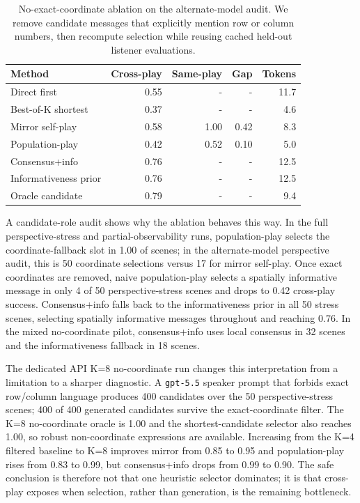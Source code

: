 \begin{table}[H]
\centering
\begin{tabular}{lrrrr}
\toprule
Method & Cross-play & Same-play & Gap & Tokens \\
\midrule
Direct first & 0.55 & - & - & 11.7 \\
Best-of-K shortest & 0.37 & - & - & 4.6 \\
Mirror self-play & 0.58 & 1.00 & 0.42 & 8.3 \\
Population-play & 0.42 & 0.52 & 0.10 & 5.0 \\
Consensus+info & 0.76 & - & - & 12.5 \\
Informativeness prior & 0.76 & - & - & 12.5 \\
Oracle candidate & 0.79 & - & - & 9.4 \\
\bottomrule
\end{tabular}
\caption{No-exact-coordinate ablation on the alternate-model audit. We remove candidate messages that explicitly mention row or column numbers, then recompute selection while reusing cached held-out listener evaluations.}
\label{tab:nocoord}
\end{table}

A candidate-role audit shows why the ablation behaves this way. In the full perspective-stress and partial-observability runs, population-play selects the coordinate-fallback slot in 1.00 of scenes; in the alternate-model perspective audit, this is 50 coordinate selections versus 17 for mirror self-play. Once exact coordinates are removed, naive population-play selects a spatially informative message in only 4 of 50 perspective-stress scenes and drops to 0.42 cross-play success. Consensus+info falls back to the informativeness prior in all 50 stress scenes, selecting spatially informative messages throughout and reaching 0.76. In the mixed no-coordinate pilot, consensus+info uses local consensus in 32 scenes and the informativeness fallback in 18 scenes.

The dedicated API K=8 no-coordinate run changes this interpretation from a limitation to a sharper diagnostic. A \texttt{gpt-5.5} speaker prompt that forbids exact row/column language produces 400 candidates over the 50 perspective-stress scenes; 400 of 400 generated candidates survive the exact-coordinate filter. The K=8 no-coordinate oracle is 1.00 and the shortest-candidate selector also reaches 1.00, so robust non-coordinate expressions are available. Increasing from the K=4 filtered baseline to K=8 improves mirror from 0.85 to 0.95 and population-play rises from 0.83 to 0.99, but consensus+info drops from 0.99 to 0.90. The safe conclusion is therefore not that one heuristic selector dominates; it is that cross-play exposes when selection, rather than generation, is the remaining bottleneck.

